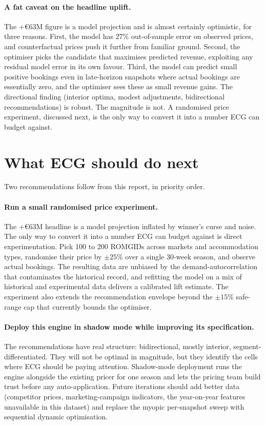 \documentclass[11pt,a4paper]{article}
\begin{document}
\paragraph{A fat caveat on the headline uplift.} The +\euro{}63M figure is a model projection and is almost certainly optimistic, for three reasons. First, the model has 27\% out-of-sample error on observed prices, and counterfactual prices push it further from familiar ground. Second, the optimiser picks the candidate that maximises predicted revenue, exploiting any residual model error in its own favour. Third, the model can predict small positive bookings even in late-horizon snapshots where actual bookings are essentially zero, and the optimiser sees these as small revenue gains. The directional finding (interior optima, modest adjustments, bidirectional recommendations) is robust. The magnitude is not. A randomised price experiment, discussed next, is the only way to convert it into a number ECG can budget against.

\section{What ECG should do next}

Two recommendations follow from this report, in priority order.

\paragraph{Run a small randomised price experiment.} The +\euro{}63M headline is a model projection inflated by winner's curse and noise. The only way to convert it into a number ECG can budget against is direct experimentation. Pick 100 to 200 ROMGIDs across markets and accommodation types, randomise their price by $\pm 25\%$ over a single 30-week season, and observe actual bookings. The resulting data are unbiased by the demand-autocorrelation that contaminates the historical record, and refitting the model on a mix of historical and experimental data delivers a calibrated lift estimate. The experiment also extends the recommendation envelope beyond the $\pm 15\%$ safe-range cap that currently bounds the optimiser.

\paragraph{Deploy this engine in shadow mode while improving its specification.} The recommendations have real structure: bidirectional, mostly interior, segment-differentiated. They will not be optimal in magnitude, but they identify the cells where ECG should be paying attention. Shadow-mode deployment runs the engine alongside the existing pricer for one season and lets the pricing team build trust before any auto-application. Future iterations should add better data (competitor prices, marketing-campaign indicators, the year-on-year features unavailable in this dataset) and replace the myopic per-snapshot sweep with sequential dynamic optimisation.
\end{document}
